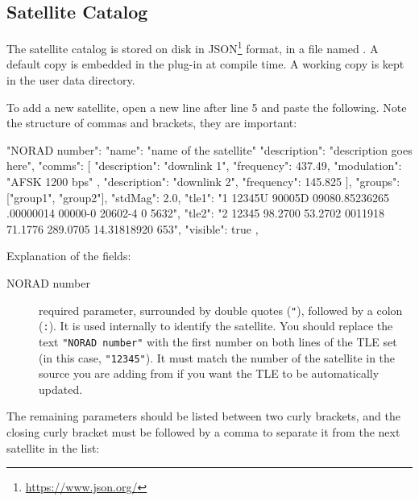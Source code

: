\subsection{Satellite Catalog}
\label{sec:plugins:Satellites:catalog}

The satellite catalog is stored on disk in JSON\footnote{\url{https://www.json.org/}}
format, in a file named . A default copy is embedded in the
plug-in at compile time. A working copy is kept in the user data directory.


To add a new satellite, open a new line after line 5 and paste the following.
Note the structure of commas and brackets, they are important:
\begin{configfileScr}
"NORAD number": 
{
  "name": "name of the satellite"
  "description": "description goes here",
  "comms": [
     {
  	"description": "downlink 1",
  	"frequency": 437.49,
  	"modulation": "AFSK 1200 bps"
     },
     {
  	"description": "downlink 2",
  	"frequency": 145.825
     }
  ],
  "groups": ["group1", "group2"],
  "stdMag": 2.0,
  "tle1": "1 12345U 90005D   09080.85236265  .00000014  00000-0  20602-4 0  5632",
  "tle2": "2 12345 98.2700  53.2702 0011918  71.1776 289.0705 14.31818920   653",
  "visible": true
},
\end{configfileScr}
Explanation of the fields:

\begin{description}
\item[NORAD number]  required parameter, surrounded by double quotes (\texttt{"}),
followed by a colon (\texttt{:}). It is used internally to identify the
satellite. You should replace the text \texttt{"NORAD number"} with the first number
on both lines of the TLE set (in this case, \texttt{"12345"}).
It must match the number of the satellite in the source you are adding from if you want the TLE to be automatically updated.
\end{description}
The remaining parameters should be listed between two curly brackets,
and the closing curly bracket must be followed by a comma to separate it from the next satellite in the list:


